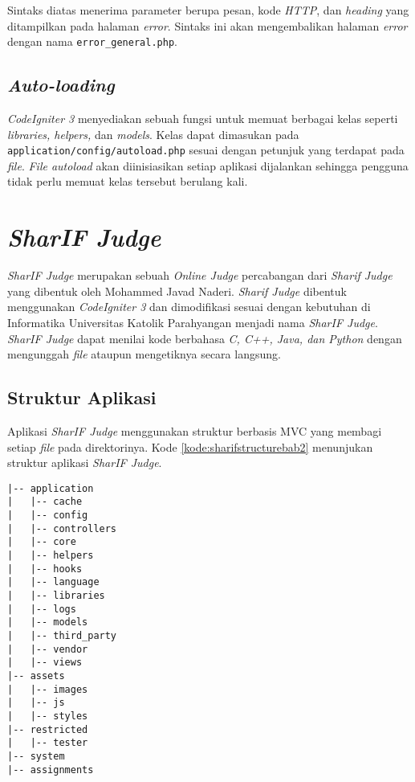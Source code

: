 Sintaks diatas menerima parameter berupa pesan, kode \textit{HTTP}, dan \textit{heading} yang ditampilkan pada halaman \textit{error}. Sintaks ini akan mengembalikan halaman \textit{error} dengan nama \texttt{error\_general.php}.

\subsection{\textit{Auto-loading}}
\textit{CodeIgniter 3} menyediakan sebuah fungsi untuk memuat berbagai kelas seperti \textit{libraries, helpers,} dan \textit{models}. Kelas dapat dimasukan pada \texttt{application/config/autoload.php} sesuai dengan petunjuk yang terdapat pada \textit{file}. \textit{File autoload} akan diinisiasikan setiap aplikasi dijalankan sehingga pengguna tidak perlu memuat kelas tersebut berulang kali. 

\section{\textit{SharIF Judge}}
\label{sec:judge}

\textit{SharIF Judge} merupakan sebuah \textit{Online Judge} percabangan dari \textit{Sharif Judge} yang dibentuk oleh Mohammed Javad Naderi. \textit{Sharif Judge} dibentuk menggunakan \textit{CodeIgniter 3} dan dimodifikasi sesuai dengan kebutuhan di Informatika Universitas Katolik Parahyangan menjadi nama \textit{SharIF Judge}. \textit{SharIF Judge} dapat menilai kode berbahasa \textit{C, C++, Java, dan Python} dengan mengunggah \textit{file} ataupun mengetiknya secara langsung.

\subsection{Struktur Aplikasi}
\label{subsec:judgestructure}

Aplikasi \textit{SharIF Judge} menggunakan struktur berbasis MVC yang membagi setiap \textit{file} pada direktorinya. Kode \ref{kode:sharifstructurebab2} menunjukan struktur aplikasi \textit{SharIF Judge}.
\begin{lstlisting}[caption=Struktur aplikasi \textit{SharIF Judge},label=kode:sharifstructurebab2]
|-- application
|   |-- cache
|   |-- config
|   |-- controllers
|   |-- core
|   |-- helpers
|   |-- hooks
|   |-- language
|   |-- libraries
|   |-- logs
|   |-- models
|   |-- third_party
|   |-- vendor
|   |-- views
|-- assets
|   |-- images
|   |-- js
|   |-- styles
|-- restricted
|   |-- tester
|-- system
|-- assignments
\end{lstlisting}

